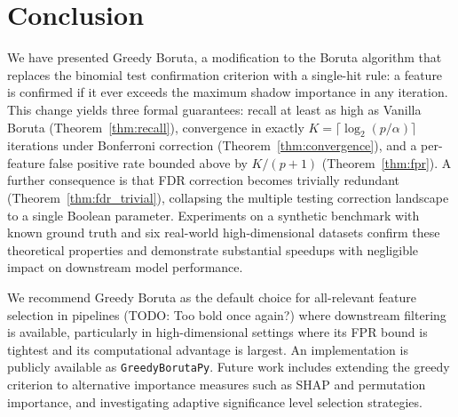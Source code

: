 \documentclass[runningheads]{llncs}
\newcommand{\writeme}[1]{\todo[inline,color=yellow!40]{WRITE: #1}}
\begin{document}

\section{Conclusion}
\label{sec:conclusion}

We have presented Greedy Boruta, a modification to the Boruta algorithm that replaces the binomial test confirmation criterion with a single-hit rule: a feature is confirmed if it ever exceeds the maximum shadow importance in any iteration. This change yields three formal guarantees: recall at least as high as Vanilla Boruta (Theorem~\ref{thm:recall}), convergence in exactly $K = \lceil \log_2(p/\alpha) \rceil$ iterations under Bonferroni correction (Theorem~\ref{thm:convergence}), and a per-feature false positive rate bounded above by $K/(p+1)$ (Theorem~\ref{thm:fpr}). A further consequence is that FDR correction becomes trivially redundant (Theorem~\ref{thm:fdr_trivial}), collapsing the multiple testing correction landscape to a single Boolean parameter. Experiments on a synthetic benchmark with known ground truth and six real-world high-dimensional datasets confirm these theoretical properties and demonstrate substantial speedups with negligible impact on downstream model performance.

We recommend Greedy Boruta as the default choice for all-relevant feature selection in pipelines (TODO: Too bold once again?) where downstream filtering is available, particularly in high-dimensional settings where its FPR bound is tightest and its computational advantage is largest. An implementation is publicly available as \texttt{GreedyBorutaPy}. Future work includes extending the greedy criterion to alternative importance measures such as SHAP and permutation importance, and investigating adaptive significance level selection strategies.

\end{document}
